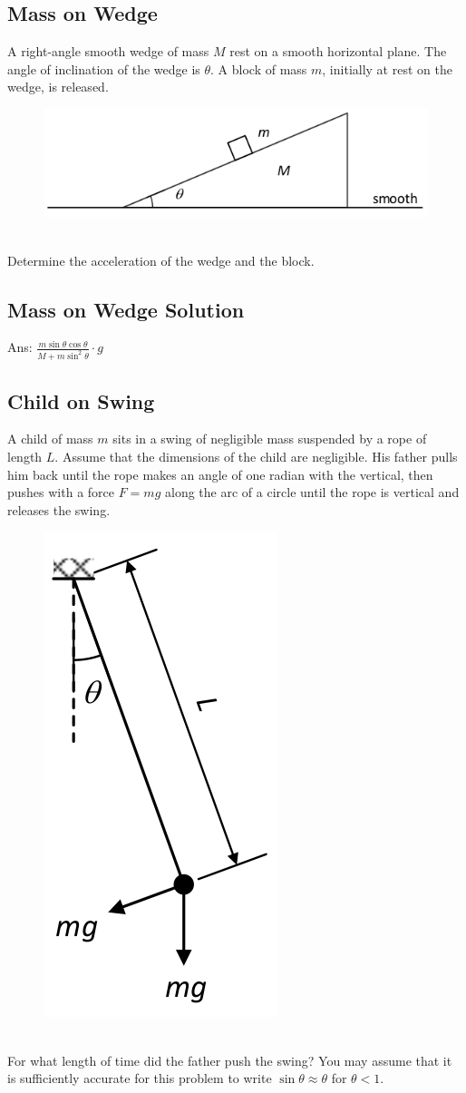 \documentclass{article}
\begin{document}
\subsection{Mass on Wedge}
A right-angle smooth wedge of mass $M$ rest on a smooth horizontal plane. The angle of inclination of the wedge is $\theta$. A block of mass $m$, initially at rest on the wedge, is released.
\begin{figure}[h]
    \centering
\includegraphics[width=0.8\linewidth]{images/massonwedge.png}
\end{figure}\\
Determine the acceleration of the wedge and the block.
\clearpage
\subsection{Mass on Wedge Solution}
Ans: $\frac{m \sin \theta \cos \theta}{M+m \sin ^2 \theta} \cdot g$
\clearpage
\subsection{Child on Swing }
A child of mass $m$ sits in a swing of negligible mass suspended by a rope of length $L$.
Assume that the dimensions of the child are negligible.
His father pulls him back until the rope makes an angle of one radian with the vertical, then pushes with a force $F=m g$ along the arc of a circle until the rope is vertical and releases the swing.
\begin{figure}[h]
    \centering
\includegraphics[width=0.3\linewidth]{images/childonswing.png}
\end{figure}\\
For what length of time did the father push the swing?
You may assume that it is sufficiently accurate for this problem to write $\sin \theta \approx \theta$ for $\theta<1$.
\clearpage
\end{document}

